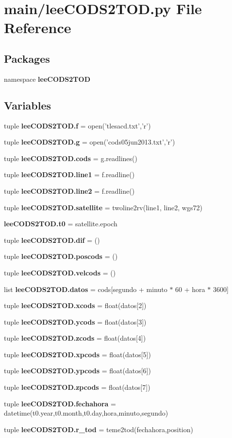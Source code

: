 \section{main/lee\-C\-O\-D\-S2\-T\-O\-D.py \-File \-Reference}
\label{lee_c_o_d_s2_t_o_d_8py}
\subsection*{\-Packages}
\begin{DoxyCompactItemize}
\item 
namespace {\bf lee\-C\-O\-D\-S2\-T\-O\-D}
\end{DoxyCompactItemize}
\subsection*{\-Variables}
\begin{DoxyCompactItemize}
\item 
tuple {\bf lee\-C\-O\-D\-S2\-T\-O\-D.\-f} = open('tlesacd.\-txt','r')
\item 
tuple {\bf lee\-C\-O\-D\-S2\-T\-O\-D.\-g} = open('cods05jun2013.\-txt','r')
\item 
tuple {\bf lee\-C\-O\-D\-S2\-T\-O\-D.\-cods} = g.\-readlines()
\item 
tuple {\bf lee\-C\-O\-D\-S2\-T\-O\-D.\-line1} = f.\-readline()
\item 
tuple {\bf lee\-C\-O\-D\-S2\-T\-O\-D.\-line2} = f.\-readline()
\item 
tuple {\bf lee\-C\-O\-D\-S2\-T\-O\-D.\-satellite} = twoline2rv(line1, line2, wgs72)
\item 
{\bf lee\-C\-O\-D\-S2\-T\-O\-D.\-t0} = satellite.\-epoch
\item 
tuple {\bf lee\-C\-O\-D\-S2\-T\-O\-D.\-dif} = ()
\item 
tuple {\bf lee\-C\-O\-D\-S2\-T\-O\-D.\-poscods} = ()
\item 
tuple {\bf lee\-C\-O\-D\-S2\-T\-O\-D.\-velcods} = ()
\item 
list {\bf lee\-C\-O\-D\-S2\-T\-O\-D.\-datos} = cods[segundo + minuto $\ast$ 60 + hora $\ast$ 3600]
\item 
tuple {\bf lee\-C\-O\-D\-S2\-T\-O\-D.\-xcods} = float(datos[2])
\item 
tuple {\bf lee\-C\-O\-D\-S2\-T\-O\-D.\-ycods} = float(datos[3])
\item 
tuple {\bf lee\-C\-O\-D\-S2\-T\-O\-D.\-zcods} = float(datos[4])
\item 
tuple {\bf lee\-C\-O\-D\-S2\-T\-O\-D.\-xpcods} = float(datos[5])
\item 
tuple {\bf lee\-C\-O\-D\-S2\-T\-O\-D.\-ypcods} = float(datos[6])
\item 
tuple {\bf lee\-C\-O\-D\-S2\-T\-O\-D.\-zpcods} = float(datos[7])
\item 
tuple {\bf lee\-C\-O\-D\-S2\-T\-O\-D.\-fechahora} = datetime(t0.\-year,t0.\-month,t0.\-day,hora,minuto,segundo)
\item 
tuple {\bf lee\-C\-O\-D\-S2\-T\-O\-D.\-r\-\_\-tod} = teme2tod(fechahora,position)
\end{DoxyCompactItemize}
